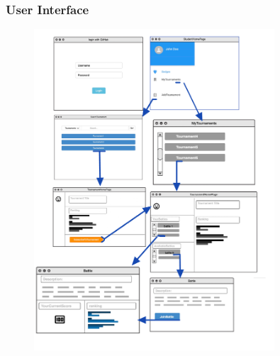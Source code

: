 \subsubsection{User Interface}
\begin{figure}[h]
  \centering
  \includegraphics[width=0.8\textwidth]{3Specific_Requirements/res/mockup.jpg}
\end{figure}

